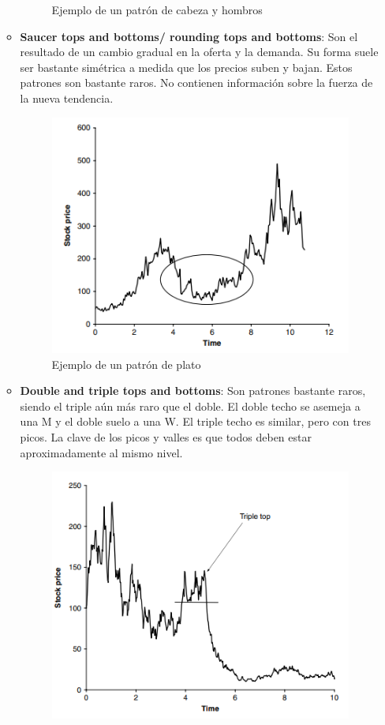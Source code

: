 \begin{itemize}
\begin{itemize}
\begin{figure}[H]
                    \caption{Ejemplo de un patrón de cabeza y hombros}
                \end{figure}
            \item \textbf{Saucer tops and bottoms/ rounding tops and bottoms}: Son el resultado de un cambio gradual en la oferta y la demanda. Su forma suele ser bastante simétrica a medida que los precios suben y bajan. Estos patrones son bastante raros. No contienen información sobre la fuerza de la nueva tendencia.
                \begin{figure}[H]
                    \centering
                    \includegraphics[width=0.65\linewidth]{Imagenes/16_Prediccion/Saucer bottom.png}
                    \caption{Ejemplo de un patrón de plato}
                \end{figure}
            \item \textbf{Double and triple tops and bottoms}: Son patrones bastante raros, siendo el triple aún más raro que el doble. El doble techo se asemeja a una M y el doble suelo a una W. El triple techo es similar, pero con tres picos. La clave de los picos y valles es que todos deben estar aproximadamente al mismo nivel.
                \begin{figure}[H]
                    \centering
                    \includegraphics[width=0.65\linewidth]{Imagenes/16_Prediccion/Triple top.png}

\end{figure}
\end{itemize}
\end{itemize}
